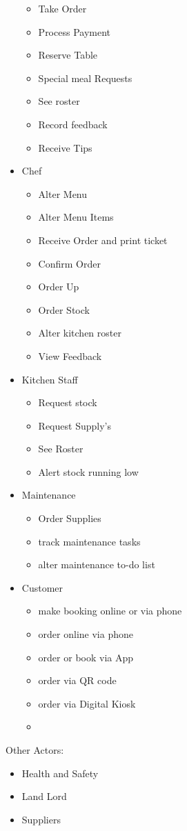 \documentclass{article}
\begin{document}
\begin{itemize}
    \begin{itemize}
        \item {Take Order}
        \item {Process Payment}
        \item {Reserve Table}
        \item {Special meal Requests}
        \item See roster
        \item Record feedback
        \item Receive Tips
    \end{itemize}
    \item {Chef}
    \begin{itemize}
        \item Alter Menu
        \item Alter Menu Items
        \item Receive Order and print ticket
        \item Confirm Order
        \item Order Up
        \item Order Stock
        \item Alter kitchen roster
        \item View Feedback
    \end{itemize}
    \item {Kitchen Staff}
    \begin{itemize}
        \item Request stock
        \item Request Supply's
        \item See Roster
        \item Alert stock running low
    \end{itemize}
    \item {Maintenance}
    \begin{itemize}
        \item Order Supplies
        \item track maintenance tasks
        \item alter maintenance to-do list
    \end{itemize}
    \item {Customer}
    \begin{itemize}
        \item make booking online or via phone
        \item order online via phone
        \item order or book via App
        \item order via QR code
        \item order via Digital Kiosk
        \item 
    \end{itemize}
\end{itemize}
Other Actors:
\begin{itemize}
    \item {Health and Safety}
    \item {Land Lord}
    \item {Suppliers}
\end{itemize}
\end{document}
